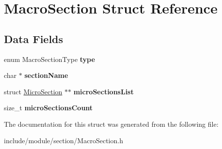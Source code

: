\hypertarget{struct_macro_section}{}\section{Macro\+Section Struct Reference}
\label{struct_macro_section}
\subsection*{Data Fields}
\begin{DoxyCompactItemize}
\item 
\hypertarget{struct_macro_section_a1f40d85e4ee917a320fd30b76d034fe5}{}\label{struct_macro_section_a1f40d85e4ee917a320fd30b76d034fe5} 
enum Macro\+Section\+Type {\bfseries type}
\item 
\hypertarget{struct_macro_section_a7dadb8f2b7c0ffb34931b35b5af02e99}{}\label{struct_macro_section_a7dadb8f2b7c0ffb34931b35b5af02e99} 
char $\ast$ {\bfseries section\+Name}
\item 
\hypertarget{struct_macro_section_a1588ef9acf9b8a267707434cb07e05a4}{}\label{struct_macro_section_a1588ef9acf9b8a267707434cb07e05a4} 
struct \hyperlink{struct_micro_section}{Micro\+Section} $\ast$$\ast$ {\bfseries micro\+Sections\+List}
\item 
\hypertarget{struct_macro_section_a11d3c23aad59b0fefc3db454777b9713}{}\label{struct_macro_section_a11d3c23aad59b0fefc3db454777b9713} 
size\+\_\+t {\bfseries micro\+Sections\+Count}
\end{DoxyCompactItemize}


The documentation for this struct was generated from the following file\+:\begin{DoxyCompactItemize}
\item 
include/module/section/Macro\+Section.\+h\end{DoxyCompactItemize}
